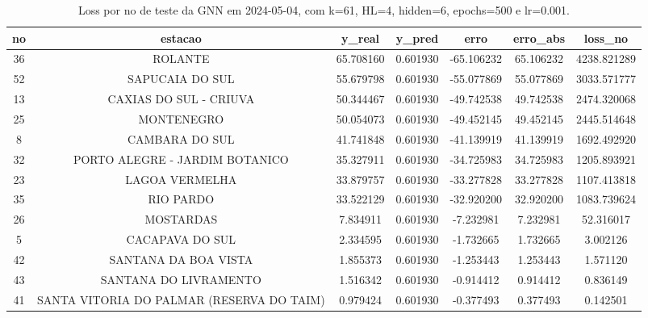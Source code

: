 \begin{table}[h]
\centering
\caption{Loss por no de teste da GNN em 2024-05-04, com k=61, HL=4, hidden=6, epochs=500 e lr=0.001.}
\label{tab:gnn_loss_k61_hl4_h6_e500_d20240504}
\begin{tabular}{ccccccc}
\toprule
no & estacao & y\_real & y\_pred & erro & erro\_abs & loss\_no \\
\midrule
36 & ROLANTE & 65.708160 & 0.601930 & -65.106232 & 65.106232 & 4238.821289 \\
52 & SAPUCAIA DO SUL & 55.679798 & 0.601930 & -55.077869 & 55.077869 & 3033.571777 \\
13 & CAXIAS DO SUL - CRIUVA & 50.344467 & 0.601930 & -49.742538 & 49.742538 & 2474.320068 \\
25 & MONTENEGRO & 50.054073 & 0.601930 & -49.452145 & 49.452145 & 2445.514648 \\
8 & CAMBARA DO SUL & 41.741848 & 0.601930 & -41.139919 & 41.139919 & 1692.492920 \\
32 & PORTO ALEGRE - JARDIM BOTANICO & 35.327911 & 0.601930 & -34.725983 & 34.725983 & 1205.893921 \\
23 & LAGOA VERMELHA & 33.879757 & 0.601930 & -33.277828 & 33.277828 & 1107.413818 \\
35 & RIO PARDO & 33.522129 & 0.601930 & -32.920200 & 32.920200 & 1083.739624 \\
26 & MOSTARDAS & 7.834911 & 0.601930 & -7.232981 & 7.232981 & 52.316017 \\
5 & CACAPAVA DO SUL & 2.334595 & 0.601930 & -1.732665 & 1.732665 & 3.002126 \\
42 & SANTANA DA BOA VISTA & 1.855373 & 0.601930 & -1.253443 & 1.253443 & 1.571120 \\
43 & SANTANA DO LIVRAMENTO & 1.516342 & 0.601930 & -0.914412 & 0.914412 & 0.836149 \\
41 & SANTA VITORIA DO PALMAR (RESERVA DO TAIM) & 0.979424 & 0.601930 & -0.377493 & 0.377493 & 0.142501 \\
\bottomrule
\end{tabular}
\end{table}
